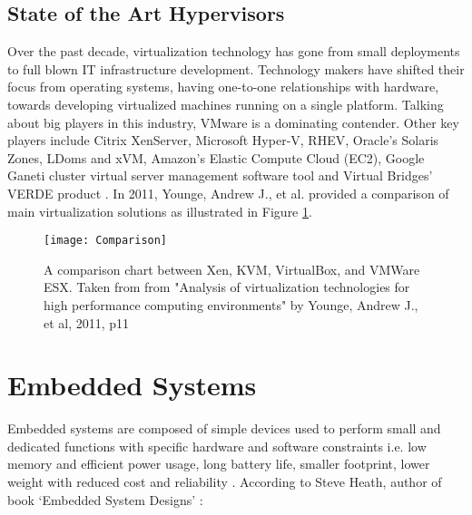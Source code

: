 \subsection{State of the Art Hypervisors\label{sec:comp}}
Over the past decade, virtualization technology has gone from small deployments to full blown IT infrastructure development. Technology makers have shifted their focus from operating systems, having one-to-one relationships with hardware, towards developing virtualized machines running on a single platform. Talking about big players in this industry, VMware is a dominating contender. Other key players include Citrix XenServer, Microsoft Hyper-V, RHEV, Oracle's Solaris Zones, LDoms and xVM, Amazon's Elastic Compute Cloud (EC2), Google Ganeti cluster virtual server management software tool and Virtual Bridges' VERDE product \cite{players}. In 2011, Younge, Andrew J., et al. \cite{younge2011analysis} provided a comparison of main virtualization solutions as illustrated in Figure \ref{comparison}.
\begin{figure}[!htbp]
	\centering
	\texttt{[image: Comparison]}
	\caption{A comparison chart between Xen, KVM, VirtualBox, and VMWare ESX. Taken from from "Analysis of virtualization technologies for high performance computing environments" by Younge, Andrew J., et al, 2011, p11}
	\label{comparison}
\end{figure}

\section{Embedded Systems \label{sec:standard}}
Embedded systems are composed of simple devices used to perform small and dedicated functions with specific hardware and software constraints i.e. low memory and efficient power usage, long battery life, smaller footprint, lower weight with reduced cost and reliability \cite{koopman1990design}. According to Steve Heath, author of book `Embedded System Designs' \cite{heath_2005}:

